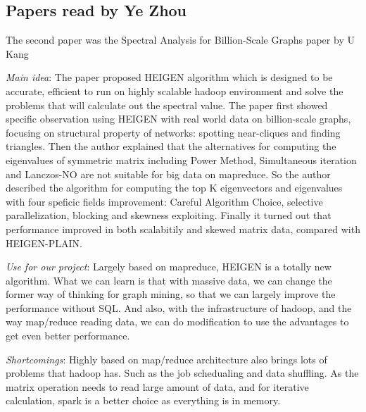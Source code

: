 \subsection{Papers read by Ye Zhou}
The second paper was the Spectral Analysis for Billion-Scale Graphs paper by U Kang
\begin{itemize*}
\item {\em Main idea}: 
      The paper proposed HEIGEN algorithm which is designed to be accurate, efficient to run on highly scalable hadoop environment and solve the problems 
      that will calculate out the spectral value. The paper first showed specific observation using HEIGEN with real world data on billion-scale graphs,
      focusing on structural property of networks: spotting near-cliques and finding triangles. Then the author explained that the alternatives for computing
      the eigenvalues of symmetric matrix including Power Method, Simultaneous iteration and Lanczos-NO are not suitable for big data on mapreduce. So the author
      described the algorithm for computing the top K eigenvectors and eigenvalues with four speficic fields improvement: Careful Algorithm Choice, selective 
      parallelization, blocking and skewness exploiting. Finally it turned out that performance improved in both scalabitily and skewed matrix data, compared with 
      HEIGEN-PLAIN.
\item {\em Use for our project}:
      Largely based on mapreduce, HEIGEN is a totally new algorithm. What we can learn is that with massive data, we can change the former way of thinking for graph mining,
      so that we can largely improve the performance without SQL. And also, with the infrastructure of hadoop, and the way map/reduce reading data, we can do modification
      to use the advantages to get even better performance.
\item {\em Shortcomings}:
      Highly based on map/reduce architecture also brings lots of problems that hadoop has. Such as the job schedualing and data shuffling. As the matrix operation needs to
      read large amount of data, and for iterative calculation, spark is a better choice as everything is in memory. 
\end{itemize*}

